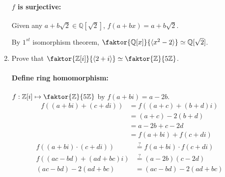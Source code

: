 \documentclass[12pt]{article}
\begin{document}
\begin{enumerate}
		\paragraph{$f$ is surjective:} Given any $a + b\sqrt{2} \in
		\mathbb{Q}[\sqrt{2}]$, $f(a+bx) = a + b\sqrt{2}$. 

		By $1^{st}$ isomorphism theorem, $\faktor{\mathbb{Q}[x]}{\langle x^2-2 \rangle}
		\simeq \mathbb{Q}[\sqrt{2}]$.

	\item Prove that $\faktor{\mathbb{Z}[i]}{\langle 2+i \rangle} \simeq
		\faktor{\mathbb{Z}}{5\mathbb{Z}}$.
		\paragraph{Define ring homomorphism:}$f:\mathbb{Z}[i] \mapsto
		\faktor{\mathbb{Z}}{5\mathbb{Z}}$ by $f(a+bi) = a-2b$.
		\begin{align*} 
		f((a+bi)+(c+di)) &= f((a+c) + (b+d)i)\\
										 &= (a+c) - 2(b+d)\\
										 &= a - 2b + c -2d\\
										 &= f(a+bi) + f(c+di)
		\end{align*} 
		\begin{align*} 
			f((a+bi)\cdot(c+di)) &\overset{?}{=} f(a+bi)\cdot f(c+di)\\
		 f((ac-bd) + (ad+bc)i) &\overset{?}{=} (a-2b)(c-2d)\\
										(ac-bd) - 2(ad+bc) &= (ac-bd) - 2(ad+bc)
		\end{align*} 


\end{enumerate}
\end{document}
